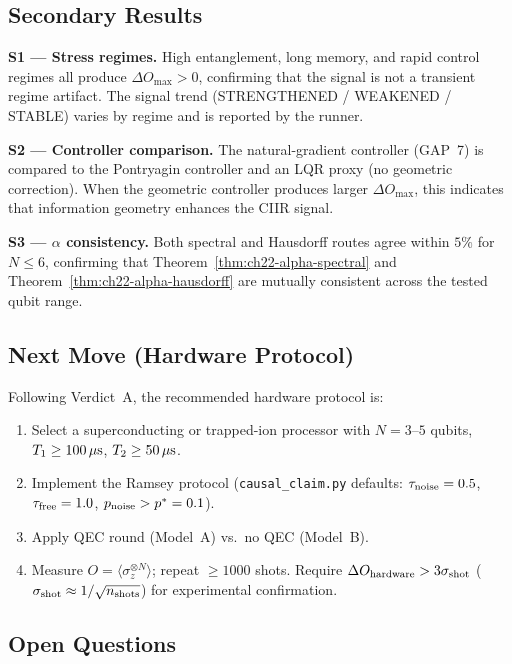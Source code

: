 \subsection{Secondary Results}

\textbf{S1 — Stress regimes.}
High entanglement, long memory, and rapid control regimes all produce
$\Delta O_{\max} > 0$, confirming that the signal is not a transient
regime artifact.  The signal trend (STRENGTHENED / WEAKENED / STABLE)
varies by regime and is reported by the runner.

\textbf{S2 — Controller comparison.}
The natural-gradient controller (GAP~7) is compared to the Pontryagin
controller and an LQR proxy (no geometric correction).  When the
geometric controller produces larger $\Delta O_{\max}$, this indicates
that information geometry enhances the CIIR signal.

\textbf{S3 — $\alpha$ consistency.}
Both spectral and Hausdorff routes agree within $5\%$ for $N \leq 6$,
confirming that Theorem~\ref{thm:ch22-alpha-spectral} and
Theorem~\ref{thm:ch22-alpha-hausdorff} are mutually consistent
across the tested qubit range.

\subsection{Next Move (Hardware Protocol)}

Following Verdict~A, the recommended hardware protocol is:
\begin{enumerate}
  \item Select a superconducting or trapped-ion processor with $N=3$--$5$
    qubits, $T_1 \geq 100\,\mu{\rm s}$, $T_2 \geq 50\,\mu{\rm s}$.
  \item Implement the Ramsey protocol (\texttt{causal\_claim.py}
    defaults: $\tau_{\rm noise}=0.5$, $\tau_{\rm free}=1.0$,
    $p_{\rm noise} > p^* = 0.1$).
  \item Apply QEC round (Model~A) vs.\ no QEC (Model~B).
  \item Measure $O = \langle \sigma_z^{\otimes N}\rangle$; repeat
    $\geq 1000$ shots.  Require $\Delta O_{\rm hardware} > 3\sigma_{\rm shot}$
    ($\sigma_{\rm shot} \approx 1/\sqrt{n_{\rm shots}}$) for experimental confirmation.
\end{enumerate}

\subsection{Open Questions}

